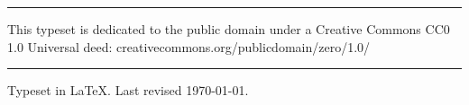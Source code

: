 \documentclass[
a5paper,
BCOR=7mm,
twoside,
DIV=calc,
11pt,
usegeometry,
chapterprefix,
headings=big]{scrbook} %
\begin{document}
\rule{0.5\textwidth}{.4pt}


This typeset is dedicated to the public domain under a Creative Commons CC0 1.0 Universal deed: creativecommons.org/publicdomain/zero/1.0/\\

\rule{0.5\textwidth}{.4pt}

Typeset in \LaTeX{}. Last revised \today.
\enlargethispage{2\baselineskip}
\thispagestyle{empty}
\end{document}
